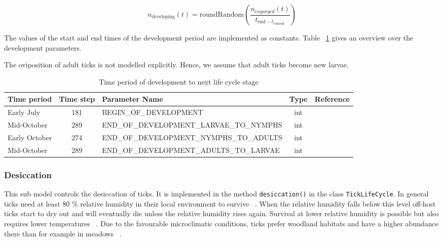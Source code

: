 \documentclass[a4paper, 11pt]{scrartcl}
\newcommand{\inlinecode}[1]{\texttt{\small #1}}
\begin{document}
\begin{equation}
n_{\text{developing}}(t) = \text{roundRandom}(\frac{n_{engorged}(t)}{t_{\text{end} - t_{\text{current}}}})
\end{equation}

The values of the start and end times of the development period are implemented as constants. Table ~\ref{tab:development_parameters} gives an overview over the development parameters.

The oviposition of adult ticks is not modelled explicitly. Hence, we assume that adult ticks become new larvae.

\begin{table}[h!]
\caption{Time period of development to next life cycle stage}
\label{tab:development_parameters}
\begin{tabularx}{\textwidth}{lclcl}
\toprule
\textbf{Time period} 	& \textbf{Time step} & \textbf{Parameter Name}							& \textbf{Type}    & \textbf{Reference} \\
\midrule
Early July   			& 181   			 & \tiny{BEGIN\_OF\_DEVELOPMENT}					& int      & ~\cite{tba}   		\\
Mid-October     		& 289      			 & \tiny{END\_OF\_DEVELOPMENT\_LARVAE\_TO\_NYMPHS}	& int      & ~\cite{tba}      	\\
Early October    		& 274    			 & \tiny{END\_OF\_DEVELOPMENT\_NYMPHS\_TO\_ADULTS}	& int      & ~\cite{tba}     	\\
Mid-October     		& 289      			 & \tiny{END\_OF\_DEVELOPMENT\_ADULTS\_TO\_LARVAE}	& int      & ~\cite{tba}        \\
\bottomrule
\end{tabularx}
\end{table}

\subsubsection{Desiccation}
This sub model controls the desiccation of ticks. It is implemented in the method \inlinecode{desiccation()} in the class \inlinecode{TickLifeCycle}. In general ticks need at least 80 \% relative humidity in their local environment to survive ~\parencite{Medlock.2013, Gray.2016, Hauser.2018}. When the relative humidity falls below this level off-host ticks start to dry out and will eventually die unless the relative humidity rises again. Survival at lower relative humidity is possible but also requires lower temperatures ~\parencite{Ostfeld.2015}. Due to the favourable microclimatic conditions, ticks prefer woodland habitats and have a higher abundance there than for example in meadows ~\parencite{Lindstrom.2003, Boehnke.2015}.
\end{document}
